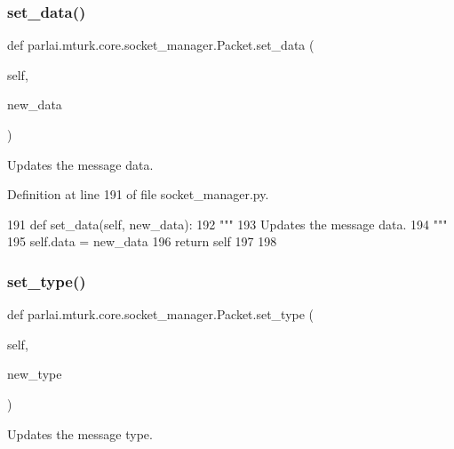 \subsubsection{\texorpdfstring{set\+\_\+data()}{set\_data()}}
{\footnotesize\ttfamily def parlai.\+mturk.\+core.\+socket\+\_\+manager.\+Packet.\+set\+\_\+data (\begin{DoxyParamCaption}\item[{}]{self,  }\item[{}]{new\+\_\+data }\end{DoxyParamCaption})}

\begin{DoxyVerb}Updates the message data.
\end{DoxyVerb}
 

Definition at line 191 of file socket\+\_\+manager.\+py.


\begin{DoxyCode}
191     \textcolor{keyword}{def }set\_data(self, new\_data):
192         \textcolor{stringliteral}{"""}
193 \textcolor{stringliteral}{        Updates the message data.}
194 \textcolor{stringliteral}{        """}
195         self.data = new\_data
196         \textcolor{keywordflow}{return} self
197 
198 
\end{DoxyCode}
\mbox{\label{classparlai_1_1mturk_1_1core_1_1socket__manager_1_1Packet_a1269876ae5939e52c10fe4526d50cde4}} 
\subsubsection{\texorpdfstring{set\+\_\+type()}{set\_type()}}
{\footnotesize\ttfamily def parlai.\+mturk.\+core.\+socket\+\_\+manager.\+Packet.\+set\+\_\+type (\begin{DoxyParamCaption}\item[{}]{self,  }\item[{}]{new\+\_\+type }\end{DoxyParamCaption})}

\begin{DoxyVerb}Updates the message type.
\end{DoxyVerb}
 

